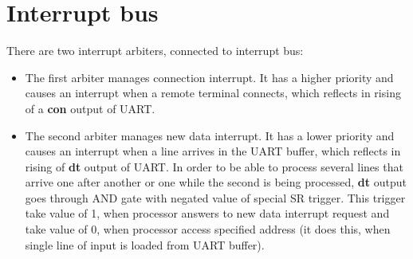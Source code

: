 \section*{Interrupt bus}

There are two interrupt arbiters, connected to interrupt bus:

\begin{itemize}
	\item The first arbiter manages connection interrupt. It has a higher priority and causes an interrupt when a remote terminal connects, which reflects in rising of a \textbf{con} output of UART.
	\item The second arbiter manages new data interrupt. It has a lower priority and causes an interrupt when a line arrives in the UART buffer, which reflects in rising of \textbf{dt} output of UART. In order to be able to process several lines that arrive one after another or one while the second is being processed, \textbf{dt} output goes through AND gate with negated value of special SR trigger. This trigger take value of 1, when processor answers to new data interrupt request and take value of 0, when processor access specified address (it does this, when single line of input is loaded from UART buffer).
\end{itemize}


